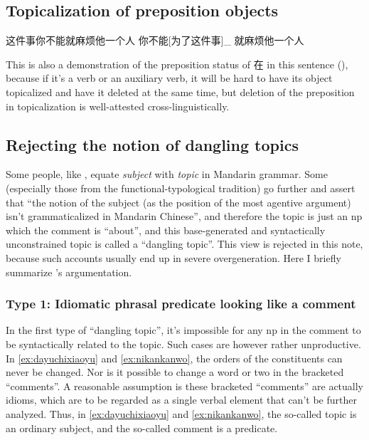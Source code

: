 \documentclass[UTF8, a4paper, oneside, scheme=plain]{ctexrep}
\newcommand*{\citesec}[1]{\S~{#1}}
\newcommand*{\term}[1]{\emph{#1}}
\begin{document}
\subsection{Topicalization of preposition objects}\label{sec:topicalization-of-preposition-objects}

\begin{exe}
    \ex\label{ex:zhejianshinibunengjiumafantayigeren} 这件事你不能就麻烦他一个人
    \ex 你不能[为了这件事]_{} 就麻烦他一个人
\end{exe}
This is also a demonstration of the preposition status of 在 in this sentence (),
because if it's a verb or an auxiliary verb,
it will be hard to have its object topicalized and have it deleted at the same time,
but deletion of the preposition in topicalization is well-attested cross-linguistically.

\subsection{Rejecting the notion of dangling topics}\label{sec:topic-subject}

Some people, like \citet[\citesec{7.1}]{zhudexigrammar},
equate \term{subject} with \term{topic} in Mandarin grammar.
Some (especially those from the functional-typological tradition) go further 
and assert that ``the notion of the subject (as the position of the most agentive argument) 
isn't grammaticalized in Mandarin Chinese'',
and therefore the topic is just an \acs{np} which the comment is ``about'',
and this base-generated and syntactically unconstrained topic 
is called a ``dangling topic''.
This view is rejected in this note,
because such accounts usually end up in severe overgeneration. 
Here I briefly summarize \citet{sih2000topic}'s argumentation.

\subsubsection{Type 1: Idiomatic phrasal predicate looking like a comment} 

In the first type of ``dangling topic'',
it's impossible for any \acs{np} in the comment to be syntactically related to the topic.
Such cases are however rather unproductive. 
In \eqref{ex:dayuchixiaoyu} and \eqref{ex:nikankanwo},
the orders of the constituents can never be changed.
Nor is it possible to change a word or two in the bracketed ``comments''.
A reasonable assumption is these bracketed ``comments''
are actually idioms, 
which are to be regarded as a single verbal element that can't be further analyzed.
Thus, in \eqref{ex:dayuchixiaoyu} and \eqref{ex:nikankanwo},
the so-called topic is an ordinary subject,
and the so-called comment is a predicate.
\end{document}
